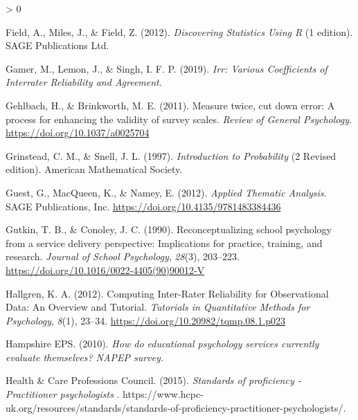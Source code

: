 \documentclass[
  english,
  man]{apa7}
\newlength{\cslhangindent}
\newenvironment{CSLReferences}[2] %
 {%
  \setlength{\parindent}{0pt}
  \ifodd #1 \everypar{\setlength{\hangindent}{\cslhangindent}}\ignorespaces\fi
  \ifnum #2 > 0
  \setlength{\parskip}{#2\baselineskip}
  \fi
 }%
 {}
\begin{document}
\begin{CSLReferences}{1}{0}
\leavevmode\hypertarget{ref-fieldDiscoveringStatisticsUsing2012}{}%
Field, A., Miles, J., \& Field, Z. (2012). \emph{Discovering {Statistics Using R}} (1 edition). {SAGE Publications Ltd}.

\leavevmode\hypertarget{ref-gamerIrrVariousCoefficients2019}{}%
Gamer, M., Lemon, J., \& Singh, I. F. P. (2019). \emph{Irr: {Various Coefficients} of {Interrater Reliability} and {Agreement}}.

\leavevmode\hypertarget{ref-gehlbachMeasureTwiceCut2011}{}%
Gehlbach, H., \& Brinkworth, M. E. (2011). Measure twice, cut down error: {A} process for enhancing the validity of survey scales. \emph{Review of General Psychology}. \url{https://doi.org/10.1037/a0025704}

\leavevmode\hypertarget{ref-grinsteadIntroductionProbability1997}{}%
Grinstead, C. M., \& Snell, J. L. (1997). \emph{Introduction to {Probability}} (2 Revised edition). {American Mathematical Society}.

\leavevmode\hypertarget{ref-guestAppliedThematicAnalysis2012}{}%
Guest, G., MacQueen, K., \& Namey, E. (2012). \emph{Applied {Thematic Analysis}}. {SAGE Publications, Inc.} \url{https://doi.org/10.4135/9781483384436}

\leavevmode\hypertarget{ref-gutkinReconceptualizingSchoolPsychology1990}{}%
Gutkin, T. B., \& Conoley, J. C. (1990). Reconceptualizing school psychology from a service delivery perspective: {Implications} for practice, training, and research. \emph{Journal of School Psychology}, \emph{28}(3), 203--223. \url{https://doi.org/10.1016/0022-4405(90)90012-V}

\leavevmode\hypertarget{ref-hallgrenComputingInterRaterReliability2012}{}%
Hallgren, K. A. (2012). Computing {Inter}-{Rater Reliability} for {Observational Data}: {An Overview} and {Tutorial}. \emph{Tutorials in Quantitative Methods for Psychology}, \emph{8}(1), 23--34. \url{https://doi.org/10.20982/tqmp.08.1.p023}

\leavevmode\hypertarget{ref-hampshireepsHowEducationalPsychology2010}{}%
Hampshire EPS. (2010). \emph{How do educational psychology services currently evaluate themselves? {NAPEP} survey.}

\leavevmode\hypertarget{ref-healthcareprofessionscouncilStandardsProficiencyPractitioner2015a}{}%
Health \& Care Professions Council. (2015). \emph{Standards of proficiency - {Practitioner} psychologists \textbar{}}. https://www.hcpc-uk.org/resources/standards/standards-of-proficiency-practitioner-psychologists/.


\end{CSLReferences}
\end{document}
